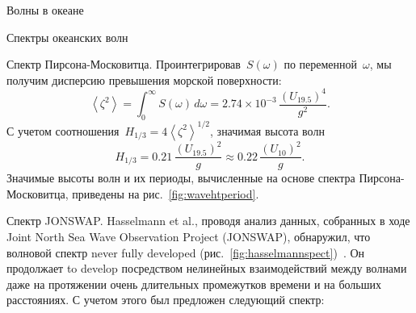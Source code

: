 \begin{chapter}{Волны в океане}
\begin{section}{Спектры океанских волн}
\begin{paragraph}{Спектр Пирсона-Московитца.}
Проинтегрировав~$S(\omega)$ по переменной~$\omega$, мы получим дисперсию
превышения морской поверхности:
\begin{equation}
 \left<\zeta ^{2}\right> 
   = \int_{0}^{\infty} S(\omega )\, d \omega 
   = 2.74 \times 10^{-3} \,\frac{\left(U_{19.5}\right)^4}{g^2}.
\end{equation}
С учетом соотношения~$H_{1/3} = 4 \left<\zeta ^{2}\right>^{1/2}$, 
значимая высота волн
\begin{equation}\label{eq:16.33}
 H_{1/3} = 0.21 \, \frac{\left(U_{19.5} \right)^2}{g}
         \approx 0.22 \,\frac{\left(U_{10} \right)^2}{g}.
\end{equation}
Значимые высоты волн и их периоды, вычисленные на основе спектра 
Пирсона-Московитца, приведены на рис.~\ref{fig:wavehtperiod}.
%
\end{paragraph}

\begin{paragraph}{Спектр JONSWAP.}
Hasselmann et al., проводя анализ данных, собранных в ходе 
Joint North Sea Wave Observation Project (JONSWAP), 
обнаружил, что волновой спектр never fully developed 
(рис.~\ref{fig:hasselmannspect})~\cite{Hasselmann:1973}. 
Он продолжает to develop посредством нелинейных взаимодействий 
между волнами даже на протяжении очень длительных промежутков времени
и на больших расстояниях. С учетом этого был предложен следующий спектр:
%


\end{paragraph}
\end{section}
\end{chapter}
